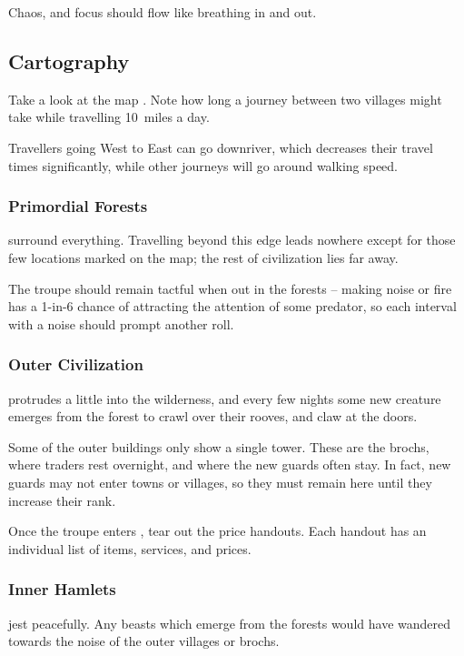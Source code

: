 \begin{multicols}{2}
Chaos, and focus should flow like breathing in and out.

\subsection{Cartography}

Take a look at the map .
Note how long a journey between two \glspl{village} might take while travelling 10~miles a day.

Travellers going West to East can go downriver, which decreases their travel times significantly, while other journeys will go around walking speed.

\subsubsection{Primordial Forests}
surround everything.
Travelling beyond this \gls{edge} leads nowhere except for those few locations marked on the map; the rest of civilization lies far away.

The troupe should remain tactful when out in the forests -- making noise or fire has a 1-in-6 chance of attracting the attention of some predator, so each \gls{interval} with a noise should prompt another roll.

\subsubsection{Outer Civilization}
protrudes a little into the wilderness, and every few nights some new creature emerges from the forest to crawl over their rooves, and claw at the doors.

Some of the outer buildings only show a single tower.
These are the \glspl{broch}, where traders rest overnight, and where the new \glspl{guard} often stay.
In fact, new \glspl{guard} may not enter towns or \glspl{village}, so they must remain here until they increase their rank.%

Once the troupe enters , tear out the price handouts.
Each handout has an individual list of items, services, and prices.

\subsubsection{Inner Hamlets}
jest peacefully.
Any beasts which emerge from the forests would have wandered towards the noise of the outer \glspl{village} or \glspl{broch}.


\end{multicols}

